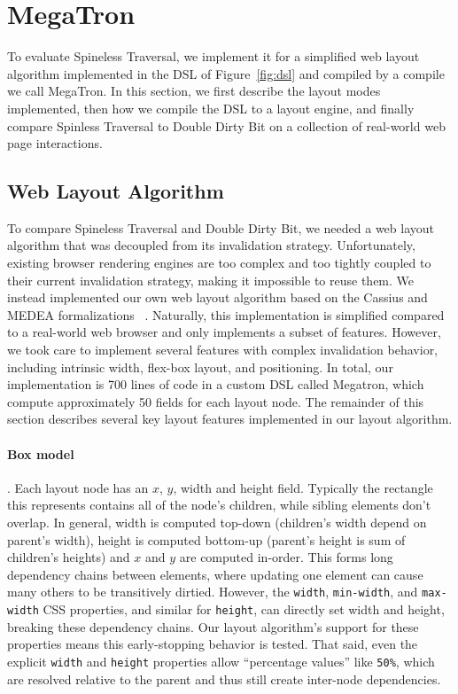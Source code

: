 \section{MegaTron}

To evaluate Spineless Traversal,
  we implement it for a simplified web layout algorithm
  implemented in the DSL of Figure~\ref{fig:dsl}
  and compiled by a compile we call MegaTron.
In this section, we first describe
  the layout modes implemented,
  then how we compile the DSL to a layout engine,
  and finally compare Spinless Traversal to Double Dirty Bit
  on a collection of real-world web page interactions.

\subsection{Web Layout Algorithm}
\label{sec:layout-impl}

To compare Spineless Traversal and Double Dirty Bit,
  we needed a web layout algorithm
  that was decoupled from its invalidation strategy.
Unfortunately, existing browser rendering engines
  are too complex and too tightly coupled
  to their current invalidation strategy,
  making it impossible to reuse them.
We instead implemented our own web layout algorithm
  based on the Cassius and MEDEA formalizations%
  ~\cite{cassius-1,cassius-2,yufeng-2}.
Naturally, this implementation is simplified
  compared to a real-world web browser
  and only implements a subset of features.
However, we took care to implement several features
  with complex invalidation behavior,
  including intrinsic width, flex-box layout, and positioning.
In total, our implementation is 700 lines of code
  in a custom DSL called Megatron,
  which compute approximately 50 fields for each layout node.
The remainder of this section describes
  several key layout features implemented in our layout algorithm.

\paragraph{Box model}.
Each layout node has an $x$, $y$, width and height field.
Typically the rectangle this represents contains
    all of the node's children, while sibling elements
    don't overlap.
In general, width is computed top-down
  (children's width depend on parent's width),
  height is computed bottom-up
  (parent's height is sum of children's heights)
  and $x$ and $y$ are computed in-order.
This forms long dependency chains between elements,
    where updating one element can cause many others
    to be transitively dirtied.
However, the \texttt{width},
    \texttt{min-width}, and \texttt{max-width} CSS properties,
    and similar for \texttt{height},
    can directly set width and height,
    breaking these dependency chains.
Our layout algorithm's support for these properties
    means this early-stopping behavior is tested.
That said, even the
  explicit \texttt{width} and \texttt{height} properties
  allow ``percentage values'' like \texttt{50\%},
  which are resolved relative to the parent and thus
  still create inter-node dependencies.
	
